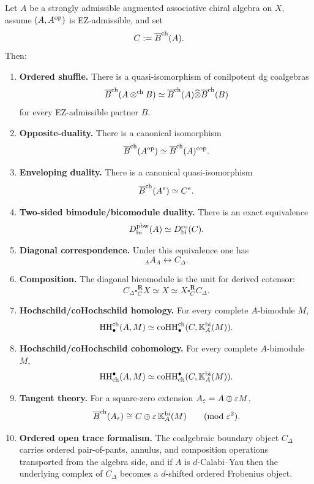 \begin{theorem}
\label{thm:master}
Let $A$ be a strongly admissible augmented associative chiral algebra on $X$, assume
$(A,A^{\mathrm{op}})$ is EZ-admissible, and set
\[
C:=\overline{B}^{\mathrm{ch}}(A).
\]
Then:
\begin{enumerate}[label=(\arabic*)]
\item \textbf{Ordered shuffle.}
There is a quasi-isomorphism of conilpotent dg coalgebras
\[
\overline{B}^{\mathrm{ch}}(A\mathbin{\otimes^{\mathrm{ch}}} B)\simeq \overline{B}^{\mathrm{ch}}(A)\widehat\otimes \overline{B}^{\mathrm{ch}}(B)
\]
for every EZ-admissible partner $B$.

\item \textbf{Opposite-duality.}
There is a canonical isomorphism
\[
\overline{B}^{\mathrm{ch}}(A^{\mathrm{op}})\simeq \overline{B}^{\mathrm{ch}}(A)^{\mathrm{cop}}.
\]

\item \textbf{Enveloping duality.}
There is a canonical quasi-isomorphism
\[
\overline{B}^{\mathrm{ch}}(A^e)\simeq C^e.
\]

\item \textbf{Two-sided bimodule/bicomodule duality.}
There is an exact equivalence
\[
D^{\mathrm{pbw}}_{\mathrm{bi}}(A)\simeq D^{\mathrm{co}}_{\mathrm{bi}}(C).
\]

\item \textbf{Diagonal correspondence.}
Under this equivalence one has
\[
{}_A A_A \longleftrightarrow C_\Delta.
\]

\item \textbf{Composition.}
The diagonal bicomodule is the unit for derived cotensor:
\[
C_\Delta\square_C^{\mathbf R} X\simeq X\simeq X\square_C^{\mathbf R}C_\Delta.
\]

\item \textbf{Hochschild/coHochschild homology.}
For every complete $A$-bimodule $M$,
\[
\operatorname{HH}^{\mathrm{ch}}_\bullet(A,M)
\simeq
\operatorname{coHH}^{\mathrm{ch}}_\bullet(C,\mathbb{K}_A^{\mathrm{bi}}(M)).
\]

\item \textbf{Hochschild/coHochschild cohomology.}
For every complete $A$-bimodule $M$,
\[
\operatorname{HH}_{\mathrm{ch}}^\bullet(A,M)
\simeq
\operatorname{coHH}_{\mathrm{ch}}^\bullet(C,\mathbb{K}_A^{\mathrm{bi}}(M)).
\]

\item \textbf{Tangent theory.}
For a square-zero extension $A_\varepsilon=A\oplus \varepsilon M$,
\[
\Barch(A_\eps)\cong C\oplus \eps\,\KK_A^{\mathrm{bi}}(M)\qquad (\mathrm{mod}\ \eps^2).
\]

\item \textbf{Ordered open trace formalism.}
The coalgebraic boundary object $C_\Delta$ carries ordered pair-of-pants, annulus, and composition
operations transported from the algebra side, and if $A$ is $d$-Calabi--Yau then the underlying
complex of $C_\Delta$ becomes a $d$-shifted ordered Frobenius object.
\end{enumerate}
\end{theorem}

